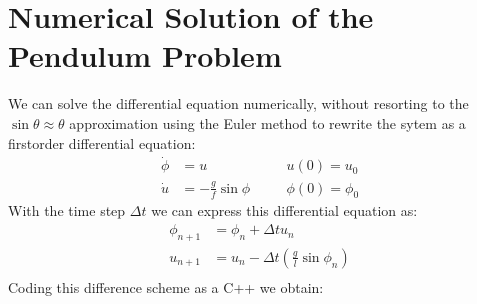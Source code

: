 \documentclass[a4paper,10pt,english]{jupyterBook}
\begin{document}
\section{Numerical Solution of the Pendulum Problem}
\label{\detokenize{text/progtut/pendulum:numerical-solution-of-the-pendulum-problem}}\label{\detokenize{text/progtut/pendulum::doc}}
\sphinxAtStartPar
We can solve the differential equation numerically, without resorting
to the \(\sin\theta \approx \theta\) approximation using the Euler method to rewrite the sytem as a first\sphinxhyphen{}order differential equation:
\begin{align*}
\dot{\phi} &= u \quad &&u(0) = u_{0} \\
\dot{u} &= -\frac{g}{f}\sin{\phi} \quad 
&&\phi(0) = \phi_{0} 
\end{align*}
\sphinxAtStartPar
With the time step \(\Delta t\) we can express this differential equation as:
\begin{align*}
\phi_{n+1} &= \phi_{n} + \Delta t u_{n} \\
u_{n+1} &= u_{n} - \Delta t(\frac{g}{l}\sin{\phi_{n}}) \\
\end{align*}
\sphinxAtStartPar
Coding this difference scheme as a C++ we obtain:
\end{document}
